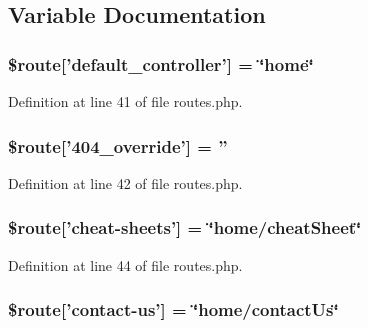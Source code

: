 \subsection{Variable Documentation}
\hypertarget{routes_8php_a6c2a82e4cec825eb1921141d08af834b}{
\subsubsection[{\$route}]{\setlength{\rightskip}{0pt plus 5cm}\$route\mbox{[}'default\-\_\-controller'\mbox{]} = \char`\"{}home\char`\"{}}}\label{routes_8php_a6c2a82e4cec825eb1921141d08af834b}


Definition at line 41 of file routes.\-php.

\hypertarget{routes_8php_ad99ba8a90b758dbe982c621c9f27eedc}{
\subsubsection[{\$route}]{\setlength{\rightskip}{0pt plus 5cm}\$route\mbox{[}'404\-\_\-override'\mbox{]} = ''}}\label{routes_8php_ad99ba8a90b758dbe982c621c9f27eedc}


Definition at line 42 of file routes.\-php.

\hypertarget{routes_8php_a68f9537f20c6adee48d71cd857b01410}{
\subsubsection[{\$route}]{\setlength{\rightskip}{0pt plus 5cm}\$route\mbox{[}'cheat-\/sheets'\mbox{]} = \char`\"{}home/cheat\-Sheet\char`\"{}}}\label{routes_8php_a68f9537f20c6adee48d71cd857b01410}


Definition at line 44 of file routes.\-php.

\hypertarget{routes_8php_a879b37eb8ab23f146ef5d9c1f99c4156}{
\subsubsection[{\$route}]{\setlength{\rightskip}{0pt plus 5cm}\$route\mbox{[}'contact-\/us'\mbox{]} = \char`\"{}home/contact\-Us\char`\"{}}}\label{routes_8php_a879b37eb8ab23f146ef5d9c1f99c4156}


